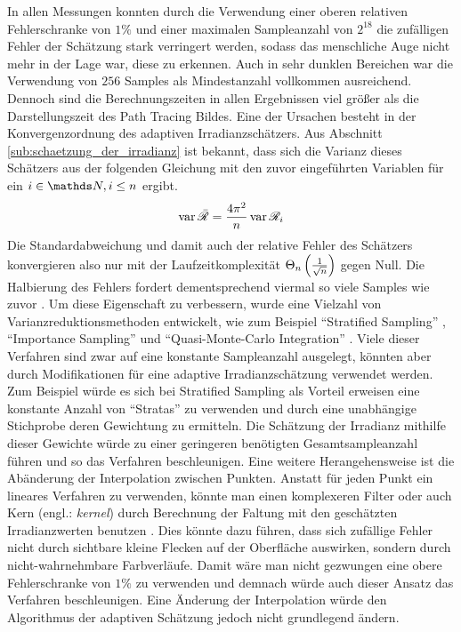 		In allen Messungen konnten durch die Verwendung einer oberen relativen Fehlerschranke von $1\unit{\%}$ und einer maximalen Sampleanzahl von $2^{18}$ die zufälligen Fehler der Schätzung stark verringert werden, sodass das menschliche Auge nicht mehr in der Lage war, diese zu erkennen.
		Auch in sehr dunklen Bereichen war die Verwendung von $256$ Samples als Mindestanzahl vollkommen ausreichend.
		Dennoch sind die Berechnungszeiten in allen Ergebnissen viel größer als die Darstellungszeit des Path Tracing Bildes.
		Eine der Ursachen besteht in der Konvergenzordnung des adaptiven Irradianzschätzers.
		Aus Abschnitt \ref{sub:schaetzung_der_irradianz} ist bekannt, dass sich die Varianz dieses Schätzers aus der folgenden Gleichung mit den zuvor eingeführten Variablen für ein $i\in\SN,i\leq n$ ergibt.
		\[
			\operatorname{var} \bar{\mathscr{R}} = \frac{4\pi^2}{n}\operatorname{var} \mathscr{R}_i
		\]
		Die Standardabweichung und damit auch der relative Fehler des Schätzers konvergieren also nur mit der Laufzeitkomplexität $\Theta_n\left( \frac{1}{\sqrt{n}} \right)$ gegen Null.
		Die Halbierung des Fehlers fordert dementsprechend viermal so viele Samples wie zuvor \cite[S.~39~f]{veach-thesis}.
		Um diese Eigenschaft zu verbessern, wurde eine Vielzahl von Varianzreduktionsmethoden entwickelt, wie zum Beispiel \enquote{Stratified Sampling} \cite[S.~432~ff]{pbrt3}, \enquote{Importance Sampling} \cite[S.~794~ff]{pbrt3} und \enquote{Quasi-Monte-Carlo Integration} \cite{quasi-monte-carlo}.
		Viele dieser Verfahren sind zwar auf eine konstante Sampleanzahl ausgelegt, könnten aber durch Modifikationen für eine adaptive Irradianzschätzung verwendet werden.
		Zum Beispiel würde es sich bei Stratified Sampling als Vorteil erweisen eine konstante Anzahl von \enquote{Stratas} zu verwenden und durch eine unabhängige Stichprobe deren Gewichtung zu ermitteln.
		Die Schätzung der Irradianz mithilfe dieser Gewichte würde zu einer geringeren benötigten Gesamtsampleanzahl führen und so das Verfahren beschleunigen.
		Eine weitere Herangehensweise ist die Abänderung der Interpolation zwischen Punkten.
		Anstatt für jeden Punkt ein lineares Verfahren zu verwenden, könnte man einen komplexeren Filter oder auch Kern (engl.: \textit{kernel}) durch Berechnung der Faltung mit den geschätzten Irradianzwerten benutzen \cite[S.~402~ff]{pbrt3}.
		Dies könnte dazu führen, dass sich zufällige Fehler nicht durch sichtbare kleine Flecken auf der Oberfläche auswirken, sondern durch nicht-wahrnehmbare Farbverläufe.
		Damit wäre man nicht gezwungen eine obere Fehlerschranke von $1\unit{\%}$ zu verwenden und demnach würde auch dieser Ansatz das Verfahren beschleunigen.
		Eine Änderung der Interpolation würde den Algorithmus der adaptiven Schätzung jedoch nicht grundlegend ändern.


